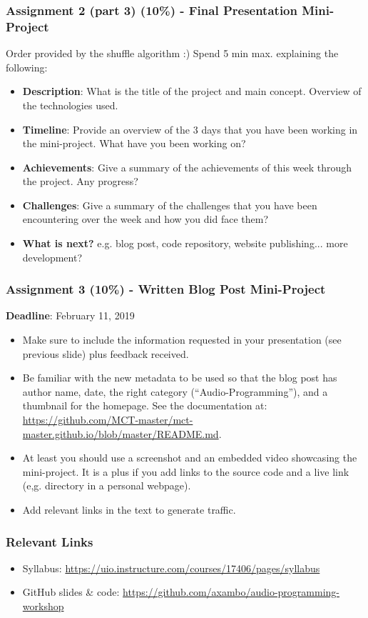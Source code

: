 \documentclass[screen, aspectratio=43]{beamer}
\begin{document}
%
\begin{frame}
\frametitle{Assignment 2 (part 3) (10\%) - Final Presentation Mini-Project}
Order provided by the shuffle algorithm :)
Spend 5 min max. explaining the following:
\begin{itemize}
\item \textbf{Description}: What is the title of the project and main concept. Overview of the technologies used.
\item \textbf{Timeline}: Provide an overview of the 3 days that you have been working in the mini-project. What have you been working on?
\item \textbf{Achievements}: Give a summary of the achievements of this week through the project. Any progress?
\item \textbf{Challenges}: Give a summary of the challenges that you have been encountering over the week and how you did face them?
\item \textbf{What is next?} e.g. blog post, code repository, website publishing... more development?
\end{itemize}
\end{frame}
%
\begin{frame}
\frametitle{Assignment 3 (10\%) - Written Blog Post Mini-Project}
\textbf{Deadline}: February 11, 2019
\begin{itemize}
\item Make sure to include the information requested in your presentation (see previous slide) plus feedback received.
\item Be familiar with the new metadata to be used so that the blog post has author name, date, the right category (``Audio-Programming''), and a thumbnail for the homepage. See the documentation at: \url{https://github.com/MCT-master/mct-master.github.io/blob/master/README.md}.
\item At least you should use a screenshot and an embedded video showcasing the mini-project. It is a plus if you add links to the source code and a live link (e,g. directory in a personal webpage).
\item Add relevant links in the text to generate traffic.
\end{itemize}
\end{frame}
%
\begin{frame}
\frametitle{Relevant Links}
\begin{itemize}
\item Syllabus: \url{https://uio.instructure.com/courses/17406/pages/syllabus}
\item GitHub slides \& code: \url{https://github.com/axambo/audio-programming-workshop}
\end{itemize}
\end{frame}
%
%
\end{document}
